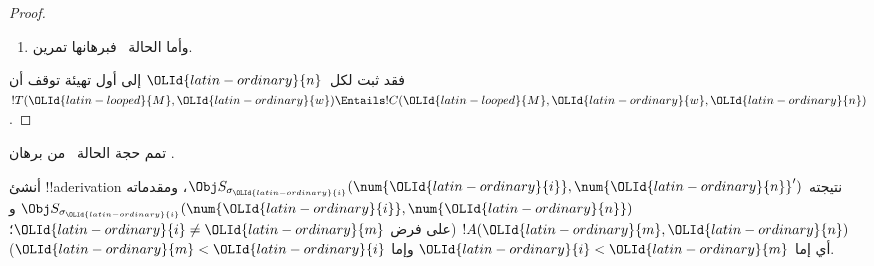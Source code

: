 \documentclass[../../../include/open-logic-section]{subfiles}
\begin{document}
\begin{proof}
\begin{enumerate}
\begin{align*}
  \num{\OLId{latin-ordinary}{n}}') \land {}\\
&\qquad \displaystyle\bigwedge_{\substack{\OLMathNumeral{0}\leq \OLId{latin-ordinary}{i}\leq \OLId{latin-ordinary}{k}\\\OLId{latin-ordinary}{i}\neq \OLId{latin-ordinary}{m}}}
  \Obj S_{\sigma_\OLId{latin-ordinary}{i}}(\num{\OLId{latin-ordinary}{i}}, \num{\OLId{latin-ordinary}{n}}') \land {} \\
& \qquad  \lforall[\OLId{latin-ordinary}{x}][(\num{\OLId{latin-ordinary}{k}} < \OLId{latin-ordinary}{x}
  \lif \Obj S_\TMblank(\OLId{latin-ordinary}{x}, \num{\OLId{latin-ordinary}{n}}'))]
\end{align*}
على الوجه المتقدم. ففي الحالة الأولى
$\num{\OLId{latin-ordinary}{l}}'\ident\num{\OLId{latin-ordinary}{l}+\OLMathNumeral{1}}\ident\num{\OLId{latin-ordinary}{m}}$، وفي الثانية
$\num{\OLId{latin-ordinary}{l}}\ident\num{\OLMathNumeral{0}}$. والحاصل هو $!C(\OLId{latin-looped}{M},\OLId{latin-ordinary}{w},\OLId{latin-ordinary}{n}+\OLMathNumeral{1})$ نفسه.

\item وأما الحالة~ فبرهانها تمرين.
\end{enumerate}
فقد ثبت لكل~$\OLId{latin-ordinary}{n}$ إلى أول تهيئة توقف أن
$!T(\OLId{latin-looped}{M},\OLId{latin-ordinary}{w})\Entails !C(\OLId{latin-looped}{M},\OLId{latin-ordinary}{w},\OLId{latin-ordinary}{n})$.
\end{proof}

\begin{prob}
تمم حجة الحالة~ من برهان
.
\end{prob}

\begin{prob}
أنشئ !!a{derivation} نتيجته $\Obj S_{\sigma_\OLId{latin-ordinary}{i}}(\num{\OLId{latin-ordinary}{i}},\num{\OLId{latin-ordinary}{n}}')$، ومقدماته
$\Obj S_{\sigma_\OLId{latin-ordinary}{i}}(\num{\OLId{latin-ordinary}{i}},\num{\OLId{latin-ordinary}{n}})$ و$!A(\OLId{latin-ordinary}{m},\OLId{latin-ordinary}{n})$ (على فرض
$\OLId{latin-ordinary}{i}\neq \OLId{latin-ordinary}{m}$؛ أي إما $\OLId{latin-ordinary}{i}<\OLId{latin-ordinary}{m}$ وإما $\OLId{latin-ordinary}{m}<\OLId{latin-ordinary}{i}$).
\end{prob}
\end{document}
